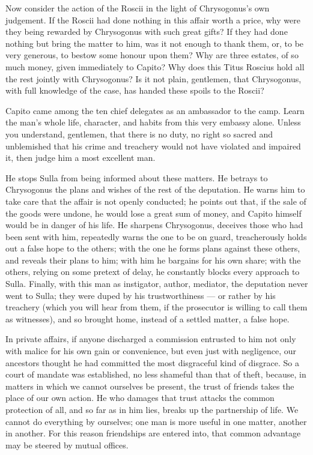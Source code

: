  Now consider the action of the Roscii in the light of Chrysogonus's own judgement. If the Roscii had done nothing in this affair worth a price, why were they being rewarded by Chrysogonus with such great gifts? If they had done nothing but bring the matter to him, was it not enough to thank them, or, to be very generous, to bestow some honour upon them? Why are three estates, of so much money, given immediately to Capito? Why does this Titus Roscius hold all the rest jointly with Chrysogonus? Is it not plain, gentlemen, that Chrysogonus, with full knowledge of the case, has handed these spoils to the Roscii?

 Capito came among the ten chief delegates as an ambassador to the camp. Learn the man's whole life, character, and habits from this very embassy alone. Unless you understand, gentlemen, that there is no duty, no right so sacred and unblemished that his crime and treachery would not have violated and impaired it, then judge him a most excellent man.

 He stops Sulla from being informed about these matters. He betrays to Chrysogonus the plans and wishes of the rest of the deputation. He warns him to take care that the affair is not openly conducted; he points out that, if the sale of the goods were undone, he would lose a great sum of money, and Capito himself would be in danger of his life. He sharpens Chrysogonus, deceives those who had been sent with him, repeatedly warns the one to be on guard, treacherously holds out a false hope to the others; with the one he forms plans against these others, and reveals their plans to him; with him he bargains for his own share; with the others, relying on some pretext of delay, he constantly blocks every approach to Sulla. Finally, with this man as instigator, author, mediator, the deputation never went to Sulla; they were duped by his trustworthiness --- or rather by his treachery (which you will hear from them, if the prosecutor is willing to call them as witnesses), and so brought home, instead of a settled matter, a false hope.

 In private affairs, if anyone discharged a commission entrusted to him not only with malice for his own gain or convenience, but even just with negligence, our ancestors thought he had committed the most disgraceful kind of disgrace. So a court of mandate was established, no less shameful than that of theft, because, in matters in which we cannot ourselves be present, the trust of friends takes the place of our own action. He who damages that trust attacks the common protection of all, and so far as in him lies, breaks up the partnership of life. We cannot do everything by ourselves; one man is more useful in one matter, another in another. For this reason friendships are entered into, that common advantage may be steered by mutual offices.

